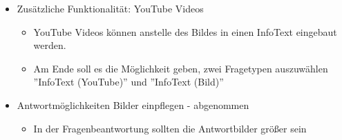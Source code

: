 \documentclass[colorback, accentcolor=tud1c, paper=a4]{tudexercise}
\begin{document}
\begin{multicols}{2}
\begin{itemize}
	\item Zusätzliche Funktionalität: YouTube Videos
	\begin{itemize}
		\item YouTube Videos können anstelle des Bildes in einen InfoText eingebaut werden.
		\item Am Ende soll es die Möglichkeit geben, zwei Fragetypen auszuwählen ''InfoText (YouTube)'' und ''InfoText (Bild)''
	\end{itemize}
	\item Antwortmöglichkeiten Bilder einpflegen - abgenommen
	\begin{itemize}
		\item In der Fragenbeantwortung sollten die Antwortbilder größer sein
	\end{itemize}
\end{itemize}
\end{multicols}
\end{document}
